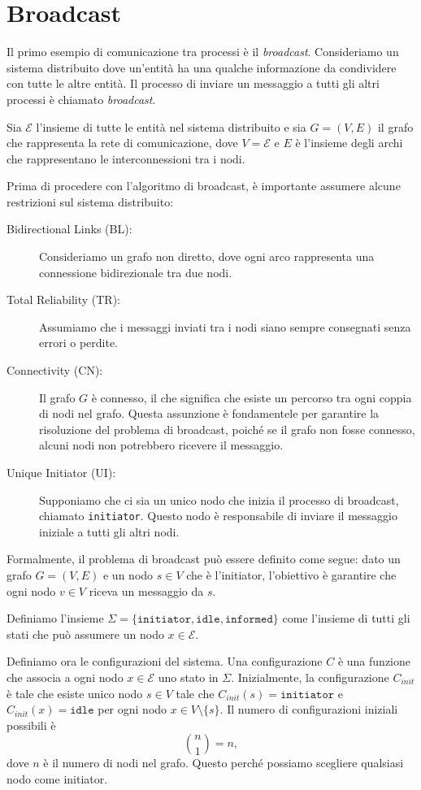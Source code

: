 \chapter{Broadcast}

Il primo esempio di comunicazione tra processi è il \textit{broadcast}. Consideriamo un sistema distribuito dove un'entità ha una qualche informazione da condividere con tutte le altre entità. Il processo di inviare un messaggio a tutti gli altri processi è chiamato \textit{broadcast}.

Sia $\mathcal{E}$ l'insieme di tutte le entità nel sistema distribuito e sia $G = (V, E)$ il grafo che rappresenta la rete di comunicazione, dove $V = \mathcal{E}$ e $E$ è l'insieme degli archi che rappresentano le interconnessioni tra i nodi.

Prima di procedere con l'algoritmo di broadcast, è importante assumere alcune restrizioni sul sistema distribuito:
\begin{description}
    \item[Bidirectional Links (BL):] Consideriamo un grafo non diretto, dove ogni arco rappresenta una connessione bidirezionale tra due nodi.
    \item[Total Reliability (TR):] Assumiamo che i messaggi inviati tra i nodi siano sempre consegnati senza errori o perdite.
    \item[Connectivity (CN):] Il grafo $G$ è connesso, il che significa che esiste un percorso tra ogni coppia di nodi nel grafo. Questa assunzione è fondamentele per garantire la risoluzione del problema di broadcast, poiché se il grafo non fosse connesso, alcuni nodi non potrebbero ricevere il messaggio.
    \item[Unique Initiator (UI):] Supponiamo che ci sia un unico nodo che inizia il processo di broadcast, chiamato \texttt{initiator}. Questo nodo è responsabile di inviare il messaggio iniziale a tutti gli altri nodi.
\end{description}

Formalmente, il problema di broadcast può essere definito come segue: dato un grafo $G = (V, E)$ e un nodo $s \in V$ che è l'initiator, l'obiettivo è garantire che ogni nodo $v \in V$ riceva un messaggio da $s$. 

Definiamo l'insieme $\Sigma = \{\texttt{initiator}, \texttt{idle}, \texttt{informed}\}$ come l'insieme di tutti gli stati che può assumere un nodo $x \in \mathcal{E}$.

Definiamo ora le configurazioni del sistema. Una configurazione $C$ è una funzione che associa a ogni nodo $x \in \mathcal{E}$ uno stato in $\Sigma$. Inizialmente, la configurazione $C_{init}$ è tale che esiste unico nodo $s \in V$ tale che $C_{init}(s) = \texttt{initiator}$ e $C_{init}(x) = \texttt{idle}$ per ogni nodo $x \in V \setminus \{s\}$. Il numero di configurazioni iniziali possibili è
\[
    \binom{n}{1} = n,
\]
dove $n$ è il numero di nodi nel grafo. Questo perché possiamo scegliere qualsiasi nodo come initiator.

